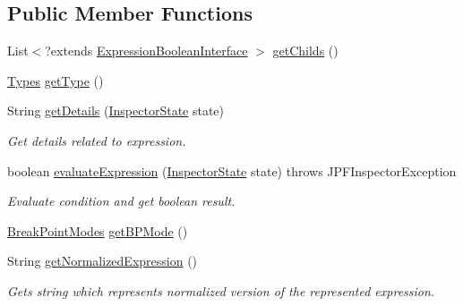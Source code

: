 \subsection*{Public Member Functions}
\begin{DoxyCompactItemize}
\item 
List$<$?extends \hyperlink{interfacegov_1_1nasa_1_1jpf_1_1inspector_1_1server_1_1expression_1_1_expression_boolean_interface}{Expression\+Boolean\+Interface} $>$ \hyperlink{classgov_1_1nasa_1_1jpf_1_1inspector_1_1server_1_1expression_1_1_expression_boolean_leaf_aa99bf3cf13bd8cc1d6c33208bc83b185}{get\+Childs} ()
\item 
\hyperlink{enumgov_1_1nasa_1_1jpf_1_1inspector_1_1server_1_1expression_1_1_types}{Types} \hyperlink{classgov_1_1nasa_1_1jpf_1_1inspector_1_1server_1_1expression_1_1_expression_boolean_aed010ff8683eb1e8621e226703133457}{get\+Type} ()
\item 
String \hyperlink{classgov_1_1nasa_1_1jpf_1_1inspector_1_1server_1_1expression_1_1_expression_boolean_a43423e204404f24bf7862de938598eb7}{get\+Details} (\hyperlink{interfacegov_1_1nasa_1_1jpf_1_1inspector_1_1server_1_1expression_1_1_inspector_state}{Inspector\+State} state)
\begin{DoxyCompactList}\small\item\em Get details related to expression. \end{DoxyCompactList}\item 
boolean \hyperlink{interfacegov_1_1nasa_1_1jpf_1_1inspector_1_1server_1_1expression_1_1_expression_boolean_interface_adc81f58d2517d5ccb9ace7f5d8b8211f}{evaluate\+Expression} (\hyperlink{interfacegov_1_1nasa_1_1jpf_1_1inspector_1_1server_1_1expression_1_1_inspector_state}{Inspector\+State} state)  throws J\+P\+F\+Inspector\+Exception
\begin{DoxyCompactList}\small\item\em Evaluate condition and get boolean result. \end{DoxyCompactList}\item 
\hyperlink{enumgov_1_1nasa_1_1jpf_1_1inspector_1_1server_1_1breakpoints_1_1_break_point_modes}{Break\+Point\+Modes} \hyperlink{interfacegov_1_1nasa_1_1jpf_1_1inspector_1_1server_1_1expression_1_1_expression_boolean_interface_a970737c885b2bb8abfbd5729275855ac}{get\+B\+P\+Mode} ()
\item 
String \hyperlink{interfacegov_1_1nasa_1_1jpf_1_1inspector_1_1server_1_1expression_1_1_expression_node_interface_ae5387d8da0126c1256a786d54b9bd7ce}{get\+Normalized\+Expression} ()
\begin{DoxyCompactList}\small\item\em Gets string which represents normalized version of the represented expression. \end{DoxyCompactList}\end{DoxyCompactItemize}


